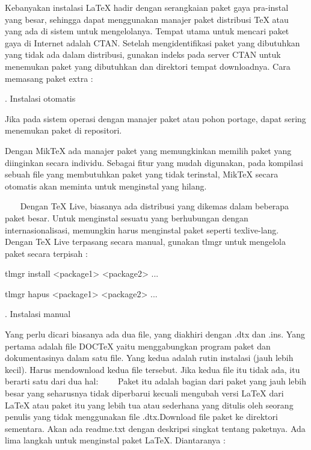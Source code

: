 Kebanyakan instalasi LaTeX hadir dengan serangkaian paket gaya pra-instal yang besar, sehingga dapat menggunakan manajer paket distribusi TeX atau yang ada di sistem untuk mengelolanya. Tempat utama untuk mencari paket gaya di Internet adalah CTAN. Setelah mengidentifikasi paket yang dibutuhkan yang tidak ada dalam distribusi, gunakan indeks pada server CTAN untuk menemukan paket yang dibutuhkan dan direktori tempat downloadnya. Cara memasang paket extra :\par

. Instalasi otomatis\par

Jika pada sistem operasi dengan manajer paket atau pohon portage, dapat sering menemukan paket di repositori. \par

Dengan MikTeX ada manajer paket yang memungkinkan memilih paket yang diinginkan secara individu. Sebagai fitur yang mudah digunakan, pada kompilasi sebuah file yang membutuhkan paket yang tidak terinstal, MikTeX secara otomatis akan meminta untuk menginstal yang hilang.

~~~ Dengan TeX Live, biasanya ada distribusi yang dikemas dalam beberapa paket besar. Untuk menginstal sesuatu yang berhubungan dengan internasionalisasi, memungkin harus menginstal paket seperti texlive-lang. Dengan TeX Live terpasang secara manual, gunakan tlmgr untuk mengelola paket secara terpisah :

tlmgr install <package1> <package2> ... \par

tlmgr hapus <package1> <package2> ...\par

\vspace{12pt}
. Instalasi manual\par
Yang perlu dicari biasanya ada dua file, yang diakhiri dengan .dtx dan .ins. Yang pertama adalah file DOCTeX yaitu menggabungkan program paket dan dokumentasinya dalam satu file. Yang kedua adalah rutin instalasi (jauh lebih kecil). Harus mendownload kedua file tersebut. Jika kedua file itu tidak ada, itu berarti satu dari dua hal:     Paket itu adalah bagian dari paket yang jauh lebih besar yang seharusnya tidak diperbarui kecuali mengubah versi LaTeX dari LaTeX atau paket itu yang lebih tua atau sederhana yang ditulis oleh seorang penulis yang tidak menggunakan file .dtx.Download file paket ke direktori sementara. Akan ada readme.txt dengan deskripsi singkat tentang paketnya.  Ada lima langkah untuk menginstal paket LaTeX. Diantaranya :

